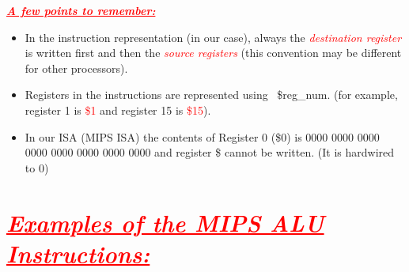 \documentclass[
  14pt,
  a4paper,
  DIV=11,
  numbers=noendperiod,
  headinclude=true,
  footinclude=true]{scrreprt}
\providecommand{\tightlist}{%
  \setlength{\itemsep}{0pt}\setlength{\parskip}{0pt}}\usepackage{longtable,booktabs,array}
\begin{document}
\newpage{}

\textcolor{red}{\textbf{\emph{\underline{A few points to remember:}}}}

\begin{tcolorbox}[colback=boxbodycol, colframe=boxbodycol]

\begin{itemize}
\tightlist
\item
  In the instruction representation (in our case), always the
  \textcolor{red}{\emph{destination register}} is written first and then
  the \textcolor{red}{\emph{source registers}} (this convention may be
  different for other processors).
\item
  Registers in the instructions are represented using ~\$reg\_num. (for
  example, register 1 is \textcolor{red}{\$1} and register 15 is
  \textcolor{red}{\$15}).
\item
  In our ISA (MIPS ISA) the contents of Register 0 (\$0) is 0000 0000
  0000 0000 0000 0000 0000 0000 and register \$ cannot be written. (It
  is hardwired to 0)
\end{itemize}

\end{tcolorbox}

\section{\texorpdfstring{\textcolor{red}{\underline{\textit{Examples of the MIPS ALU Instructions:}}}}{}}\label{section-5}

\begin{tcolorbox}[colback=boxbodycol, colframe=boxbodycol]

\end{tcolorbox}
\end{document}
